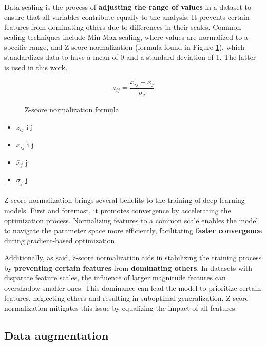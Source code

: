Data scaling is the process of \textbf{adjusting the range of values} in a dataset to ensure that all variables contribute equally to the analysis. It prevents certain features from dominating others due to differences in their scales. Common scaling techniques include Min-Max scaling, where values are normalized to a specific range, and Z-score normalization (formula found in Figure \ref{eq:standardization}), which standardizes data to have a mean of 0 and a standard deviation of 1. The latter is used in this work.

\begin{figure}
\[ z_{ij} = \frac{{x_{ij} - \bar{x}_j}}{{\sigma_j}} \]
\caption{Z-score normalization formula}
\label{eq:standardization}
\end{figure}
\begin{itemize}[noitemsep, leftmargin=*]
  \item[] $z_{ij}$  i j
  \item[] $x_{ij}$  i j 
  \item[] $\bar{x}_j$  j 
  \item[] $\sigma_j$  j
\end{itemize}


\paragraph{}Z-score normalization brings several benefits to the training of deep learning models. First and foremost, it promotes convergence by accelerating the optimization process. Normalizing features to a common scale enables the model to navigate the parameter space more efficiently, facilitating \textbf{faster convergence} during gradient-based optimization.

Additionally, as said, z-score normalization aids in stabilizing the training process by \textbf{preventing certain features }from\textbf{ dominating others}. In datasets with disparate feature scales, the influence of larger magnitude features can overshadow smaller ones. This dominance can lead the model to prioritize certain features, neglecting others and resulting in suboptimal generalization. Z-score normalization mitigates this issue by equalizing the impact of all features.

\subsection{Data augmentation}
\label{subsec:data-augmentation}

